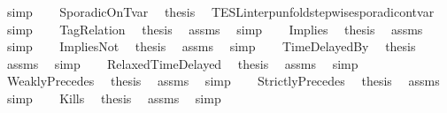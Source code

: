\begin{isabellebody}
\ simp\isanewline
{}\isamarkupfalse%
\isanewline
\ \ \isamarkupfalse%
\ SporadicOnTvar\ \isamarkupfalse%
\ {\isacharquery}thesis\ \isamarkupfalse%
\ TESL{\isacharunderscore}interp{\isacharunderscore}unfold{\isacharunderscore}stepwise{\isacharunderscore}sporadicon{\isacharunderscore}tvar\ \isamarkupfalse%
\ simp\isanewline
{}\isamarkupfalse%
\isanewline
\ \ \isamarkupfalse%
\ TagRelation\ \isamarkupfalse%
\ {\isacharquery}thesis\ \isamarkupfalse%
\ assms\ \isamarkupfalse%
\ simp\isanewline
{}\isamarkupfalse%
\isanewline
\ \ \isamarkupfalse%
\ Implies\ \isamarkupfalse%
\ {\isacharquery}thesis\ \isamarkupfalse%
\ assms\ \isamarkupfalse%
\ simp\isanewline
{}\isamarkupfalse%
\isanewline
\ \ \isamarkupfalse%
\ ImpliesNot\ \isamarkupfalse%
\ {\isacharquery}thesis\ \isamarkupfalse%
\ assms\ \isamarkupfalse%
\ simp\isanewline
{}\isamarkupfalse%
\isanewline
\ \ \isamarkupfalse%
\ TimeDelayedBy\ \isamarkupfalse%
\ {\isacharquery}thesis\ \isamarkupfalse%
\ assms\ \isamarkupfalse%
\ simp\isanewline
{}\isamarkupfalse%
\isanewline
\ \ \isamarkupfalse%
\ RelaxedTimeDelayed\ \isamarkupfalse%
\ {\isacharquery}thesis\ \isamarkupfalse%
\ assms\ \isamarkupfalse%
\ simp\isanewline
{}\isamarkupfalse%
\isanewline
\ \ \isamarkupfalse%
\ WeaklyPrecedes\ \isamarkupfalse%
\ {\isacharquery}thesis\ \isamarkupfalse%
\ assms\ \isamarkupfalse%
\ simp\isanewline
{}\isamarkupfalse%
\isanewline
\ \ \isamarkupfalse%
\ StrictlyPrecedes\ \isamarkupfalse%
\ {\isacharquery}thesis\ \isamarkupfalse%
\ assms\ \isamarkupfalse%
\ simp\isanewline
{}\isamarkupfalse%
\isanewline
\ \ \isamarkupfalse%
\ Kills\ \isamarkupfalse%
\ {\isacharquery}thesis\ \isamarkupfalse%
\ assms\ \isamarkupfalse%
\ simp\isanewline
\ \ \isamarkupfalse%
%
\endisatagproof
{\isafoldproof}%
%
\isadelimproof
%
\endisadelimproof
%
\begin{isamarkuptext}%

\end{isamarkuptext}
\end{isabellebody}
